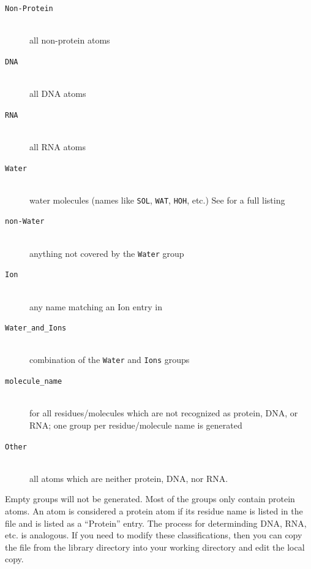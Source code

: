 \begin{description}
\item[{\tt Non-Protein}]\mbox{}\\
        all non-protein atoms
\item[{\tt DNA}]\mbox{}\\
        all DNA atoms
\item[{\tt RNA}]\mbox{}\\
        all RNA atoms
\item[{\tt Water}]\mbox{}\\
        water molecules (names like {\tt SOL}, {\tt WAT}, {\tt HOH}, etc.)  See
        {\tt {}} for a full listing
\item[{\tt non-Water}]\mbox{}\\
        anything not covered by the {\tt Water} group
\item[{\tt Ion}]\mbox{}\\
        any name matching an Ion entry in {\tt {}}
\item[{\tt Water_and_Ions}]\mbox{}\\
        combination of the {\tt Water} and {\tt Ions} groups 
\item[{\tt molecule_name}]\mbox{}\\
        for all residues/molecules which are not recognized as protein,
        DNA, or RNA; one group per residue/molecule name is generated
\item[{\tt Other}]\mbox{}\\
        all atoms which are neither protein, DNA, nor RNA.
\end{description}
Empty groups will not be generated.
Most of the groups only contain protein atoms.
An atom is considered a protein atom if its residue name is listed
in the {\tt {}} file and is listed as a
``Protein'' entry.  The process for determinding DNA, RNA, etc. is
analogous. If you need to modify these classifications, then you
can copy the file from the library directory into your working
directory and edit the local copy.


